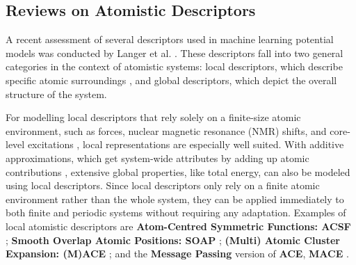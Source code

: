 \subsection{Reviews on Atomistic Descriptors} \label{subsec:2.4.1}
A recent assessment of several descriptors used in machine learning potential models was conducted by Langer et al. \cite{Langer2022}.
These descriptors fall into two general categories in the context of atomistic systems: local descriptors, which describe specific atomic surroundings \cite{Bartk2013}, and global descriptors, which depict the overall structure of the system.

For modelling local descriptors that rely solely on a finite-size atomic environment, such as forces, nuclear magnetic resonance (NMR) shifts, and core-level excitations \cite{Behler2007, Rupp2015}, local representations are especially well suited.
With additive approximations, which get system-wide attributes by adding up atomic contributions \cite{Himanen2020}, extensive global properties, like total energy, can also be modeled using local descriptors.
Since local descriptors only rely on a finite atomic environment rather than the whole system, they can be applied immediately to both finite and periodic systems without requiring any adaptation.
Examples of local atomistic descriptors are \textbf{Atom-Centred Symmetric Functions: ACSF} \cite{Behler2007,Behler2011}; \textbf{Smooth Overlap Atomic Positions: SOAP} \cite{Bartk2013,Bartk2015,Deringer2021}; \textbf{(Multi) Atomic Cluster Expansion: (M)ACE} \cite{Drautz2019, Musil2021, Dusson2022, Witt2023}; and the \textbf{Message Passing} version of \textbf{ACE}, \textbf{MACE} \cite{https://doi.org/10.48550/arxiv.2206.07697, Batatia2025}.

